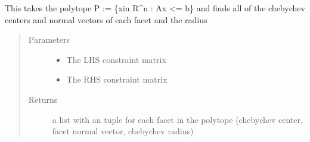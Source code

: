\documentclass[letterpaper,10pt,english]{sphinxmanual}
\begin{document}

\begin{fulllineitems}
\label{\detokenize{ppopt.mp_solvers:ppopt.mp_solvers.solver_utils.generate_reduce}}
\end{fulllineitems}


\begin{fulllineitems}
\label{\detokenize{ppopt.mp_solvers:ppopt.mp_solvers.solver_utils.get_facet_centers}}
\sphinxAtStartPar
This takes the polytope P := \{xin R\textasciicircum{}n : Ax \textless{}= b\} and finds all of the chebychev centers and normal vectors of each
facet and the radius
\begin{quote}\begin{description}
\item[{Parameters}] \leavevmode\begin{itemize}
\item {} 
\sphinxAtStartPar
{} \textendash{} The LHS constraint matrix

\item {} 
\sphinxAtStartPar
{} \textendash{} The RHS constraint matrix

\end{itemize}

\item[{Returns}] \leavevmode
\sphinxAtStartPar
a list with an tuple for each facet in the polytope (chebychev center, facet normal vector, chebychev radius)

\end{description}\end{quote}

\end{fulllineitems}
\end{document}
